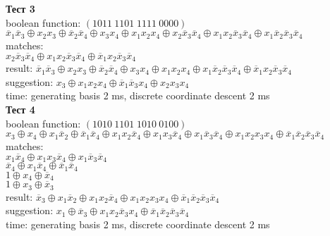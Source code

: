 \documentclass[a4paper,12pt,titlepage,finall]{article}
\begin{document}
\textbf{Тест 3}
\\boolean function: $(1011\:1101\;1111\:0000)$
\: $\overline x_1 \overline x_3 \oplus x_2 x_3 \oplus \overline x_2 \overline x_4 \oplus x_3 x_4 \oplus x_1 x_2 x_4 \oplus x_2 \overline x_3 \overline x_4 \oplus x_1 x_2 \overline x_3 \overline x_4 \oplus x_1 \overline x_2 \overline x_3 \overline x_4$
\\matches:
\\$x_2 \overline x_3 \overline x_4 \oplus x_1 x_2 \overline x_3 \overline x_4 \oplus \overline x_1 x_2 \overline x_3 \overline x_4$
\\result: $\overline x_1 \overline x_3 \oplus x_2 x_3 \oplus \overline x_2 \overline x_4 \oplus x_3 x_4 \oplus x_1 x_2 x_4 \oplus x_1 \overline x_2 \overline x_3 \overline x_4 \oplus \overline x_1 x_2 \overline x_3 \overline x_4$
\\suggestion: $x_3 \oplus x_1 x_2 x_4 \oplus \overline x_1 \overline x_3 x_4 \oplus x_2 x_3 x_4$
\\time: generating basis 2 ms, discrete coordinate descent 2 ms\\

\textbf{Тест 4}
\\boolean function: $(1010\:1101\;1010\:0100)$
\: $x_3 \oplus x_4 \oplus x_1 \overline x_2 \oplus \overline x_1 \overline x_4 \oplus x_1 x_2 \overline x_4 \oplus x_1 x_3 \overline x_4 \oplus x_1 \overline x_3 \overline x_4 \oplus x_1 x_2 x_3 x_4 \oplus \overline x_1 \overline x_2 \overline x_3 \overline x_4$
\\matches:
\\$x_1 \overline x_4 \oplus x_1 x_3 \overline x_4 \oplus x_1 \overline x_3 \overline x_4$
\\$\overline x_4 \oplus x_1 \overline x_4 \oplus \overline x_1 \overline x_4$
\\$1 \oplus x_4 \oplus \overline x_4$
\\$1 \oplus x_3 \oplus \overline x_3$
\\result: $\overline x_3 \oplus x_1 \overline x_2 \oplus x_1 x_2 \overline x_4 \oplus x_1 x_2 x_3 x_4 \oplus \overline x_1 \overline x_2 \overline x_3 \overline x_4$
\\suggestion: $x_1 \oplus \overline x_3 \oplus x_1 x_2 \overline x_3 x_4 \oplus \overline x_1 \overline x_2 \overline x_3 \overline x_4$
\\time: generating basis 2 ms, discrete coordinate descent 2 ms\\
\end{document}
